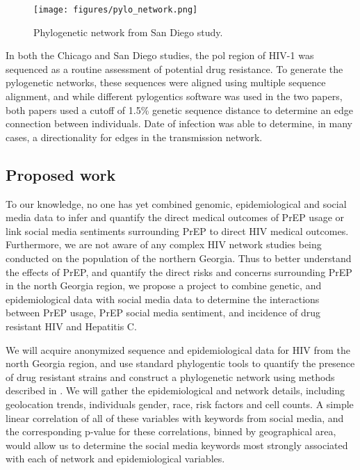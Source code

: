 \begin{figure*}
\centering
\texttt{[image: figures/pylo\_network.png]}
\caption{Phylogenetic network from San Diego study\cite{little2014using}.}
\label{fig:phylogenetic}
\end{figure*}

In both the Chicago and San Diego studies, the pol region of HIV-1 was sequenced as a routine assessment of potential drug resistance. To generate the pylogenetic networks, these sequences were aligned using multiple sequence alignment, and while different pylogentics software was used in the two papers, both papers used a cutoff of 1.5\% genetic sequence distance to determine an edge connection between individuals. Date of infection was able to determine, in many cases, a directionality for edges in the transmission network.

\subsection{Proposed work}

To our knowledge, no one has yet combined genomic, epidemiological and social media data to infer and quantify the direct medical outcomes of PrEP usage or link social media sentiments surrounding PrEP to direct HIV medical outcomes. Furthermore, we are not aware of any complex HIV network studies being conducted on the population of the northern Georgia. Thus to better understand the effects of PrEP, and quantify the direct risks and concerns surrounding PrEP in the north Georgia region, we propose a project to combine genetic, and epidemiological data with social media data to determine the interactions between PrEP usage, PrEP social media sentiment, and incidence of drug resistant HIV and Hepatitis C.

We will acquire anonymized sequence and epidemiological data for HIV from the north Georgia region, and use standard phylogentic tools to quantify the presence of drug resistant strains and construct a phylogenetic network using methods described in \cite{little2014using}. We will gather the epidemiological and network details, including geolocation trends, individuals gender, race, risk factors and cell counts. A simple linear correlation of all of these variables with keywords from social media, and the corresponding p-value for these correlations, binned by geographical area, would allow us to determine the social media keywords most strongly associated with each of network and epidemiological variables.

